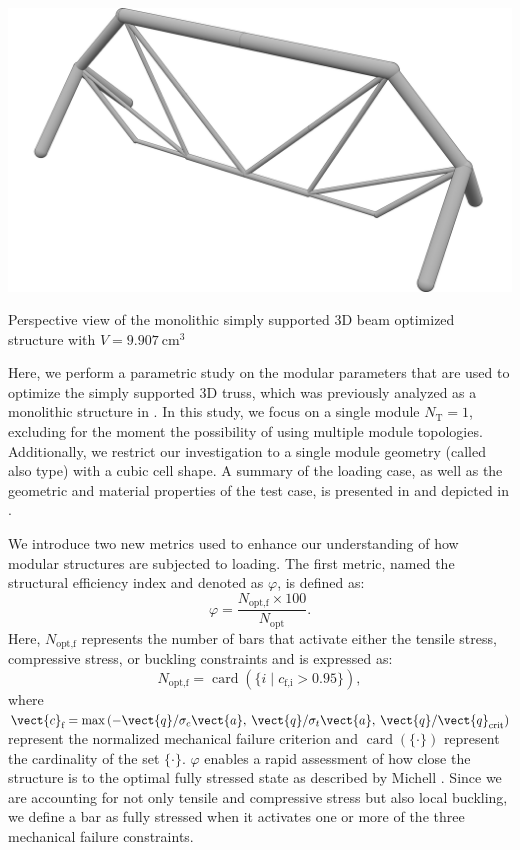 \begin{marginfigure}
    \centering
    \includegraphics[width=\linewidth]{figures/04_TTO_improvements/16_supported_3D_sol/04_Topology_NLP_iso-min.png}
    \caption{Perspective view of the monolithic simply supported 3D beam optimized structure with $V=\qty{9.907}{\centi\meter^3}$}
    \label{fig:05}
\end{marginfigure}
Here, we perform a parametric study on the modular parameters that are used to optimize the simply supported 3D truss, which was previously analyzed as a monolithic structure in . In this study, we focus on a single module $N_\text{T} = 1$, excluding for the moment the possibility of using multiple module topologies. Additionally, we restrict our investigation to a single module geometry (called also type) with a cubic cell shape. A summary of the loading case, as well as the geometric and material properties of the test case, is presented in  and depicted in .

We introduce two new metrics used to enhance our understanding of how modular structures are subjected to loading. The first metric, named the structural efficiency index and denoted as $\varphi$, is defined as:
\begin{equation}
    \varphi = \frac{N_\text{opt,f}\times100}{N_\text{opt}}.
\end{equation}
Here, $N_\text{opt,f}$ represents the number of bars that activate either the tensile stress, compressive stress, or buckling constraints and is expressed as:
\begin{equation}
    N_\text{opt,f} = \operatorname{card}(\{i\;|\;c_\text{f,i} > 0.95\}),
\end{equation}
where $\vect{c}_\text{f}=\max{\left(-\vect{q} /\sigma_c \vect{a},\:\vect{q} /\sigma_t \vect{a},\:\vect{q}/\vect{q}_{\text{crit}}\right)}$ represent the normalized mechanical failure criterion and $\operatorname{card}(\{\cdot\})$ represent the cardinality of the set $\{\cdot\}$. $\varphi$ enables a rapid assessment of how close the structure is to the optimal fully stressed state as described by Michell . Since we are accounting for not only tensile and compressive stress but also local buckling, we define a bar as fully stressed when it activates one or more of the three mechanical failure constraints.

